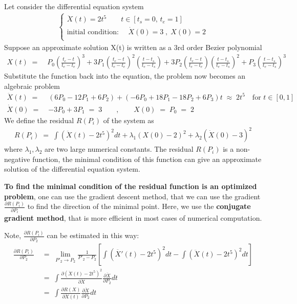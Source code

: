 \documentclass[12pt]{article}
\begin{document}
Let consider the differential equation system
%
\begin{align*}
	\left\{ \begin{array}{c}
		\ddot{X}(t) = 2 t^5 \qquad t \in [t_s=0,\, t_e=1]\\
		\textrm{initial condition: } \quad \dot{X}(0) = 3 \;,\; X(0) = 2 \\
	\end{array} \right.
\end{align*}
%
Suppose an approximate solution X(t) is written as a 3rd order Bezier polynomial
%
\begin{align*}
	X(t) \;=\; & P_{0} \left( \frac{t_{e}-t}{t_{e}-t_{e}} \right)^3 + 3 P_{1} \left( \frac{t_{e}-t}{t_{e}-t_{e}} \right)^2 \left( \frac{t-t_{s}}{t_{e}-t_{s}} \right) + 3 P_{2} \left( \frac{t_{e}-t}{t_{e}-t_{e}} \right) \left( \frac{t-t_{s}}{t_{e}-t_{s}} \right)^2 + P_{3} \left( \frac{t-t_{s}}{t_{e}-t_{s}} \right)^3
\end{align*}
%
Substitute the function back into the equation, the problem now becomes an algebraic problem
%
\begin{align*}
	\ddot{X}(t) \;=\; & \left( 6P_0 - 12P_1 + 6P_2 \right) + \left( -6P_0 + 18P_1 - 18P_2 + 6P_3 \right) t \;\approx\; 2 t^5 \quad \textrm{for $t\in[0,1]$} \\
	\dot{X}(0) \;=\; & - 3P_0 + 3P_1 \;=\; 3 \qquad,\qquad X(0) \;=\; P_0 \;=\; 2
\end{align*}
%
We define the residual $R(P_i)$ of the system as 
%
\begin{align}
	R(P_i) \;=\; \int \left( \ddot{X}(t)-2t^5 \right)^2 dt + \lambda_1 (X(0)-2)^2 + \lambda_2 (\dot{X}(0)-3)^2
\end{align}
%
where $\lambda_1,\lambda_2$ are two large numerical constants.
The residual $R(P_i)$ is a non-negative function, the minimal condition of this function can give an approximate solution of the differential equation system.


\textbf{To find the minimal condition of the residual function is an optimized problem}, one can use the gradient descent method, that we can use the gradient $\frac{\partial R(P_i)}{\partial P_i}$ to find the direction of the minimal point.
Here, we use the \textbf{conjugate gradient method}, that is more efficient in most cases of numerical computation.\cite{Shewchuk:1994}


Note, $\frac{\partial R(P_i)}{\partial P_2}$ can be estimated in this way:
%
\begin{align*}
	\frac{\partial R(P_i)}{\partial P_2} & \;=\; \lim_{P'_2\to P_2} \frac{1}{P'_2 - P_2}\left[ \int \left( \ddot{X'}(t)-2t^5 \right)^2 dt - \int \left( \ddot{X}(t)-2t^5 \right)^2 dt \right]  \\
	& \;=\; \int \frac{\partial \left( \ddot{X}(t)-2t^5 \right)^2}{\partial \ddot{X}} \frac{\partial \ddot{X}}{\partial P_2} dt \\
	& \;=\; \int \frac{\partial R(X)}{\partial \ddot{X}(t)} \frac{\partial \ddot{X}}{\partial P_2} dt
\end{align*}
\end{document}
